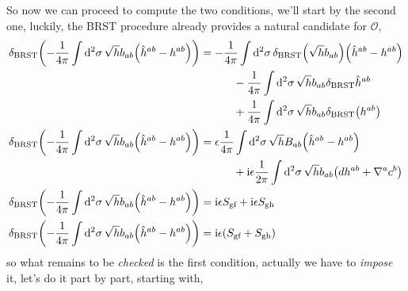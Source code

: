 So now we can proceed to compute the two conditions, we'll start by the second one, luckily, the BRST procedure already provides a natural candidate for $\mathcal O$,
\begin{align*}
    \delta_{\textnormal{BRST}}\qty(-\frac{1}{4\pi}\int\dd[2]{\sigma}\sqrt{h}b_{ab}\qty(\hat h^{ab}-h^{ab}))&=-\frac{1}{4\pi}\int\dd[2]{\sigma}\delta_{\textnormal{BRST}}\qty(\sqrt{h}b_{ab})\qty(\hat h^{ab}-h^{ab})\\
    &\quad\quad\quad-\frac{1}{4\pi}\int\dd[2]{\sigma}\sqrt{h}b_{ab}\delta_{\textnormal{BRST}}\hat h^{ab}\\
    &\quad\quad\quad+\frac{1}{4\pi}\int\dd[2]{\sigma}\sqrt{h}b_{ab}\delta_{\textnormal{BRST}}\qty(h^{ab})\\
    \delta_{\textnormal{BRST}}\qty(-\frac{1}{4\pi}\int\dd[2]{\sigma}\sqrt{h}b_{ab}\qty(\hat h^{ab}-h^{ab}))&=\epsilon\frac{1}{4\pi}\int\dd[2]{\sigma}\sqrt{h}B_{ab}\qty(\hat h^{ab}-h^{ab})\\
    &\quad\quad\quad+\textnormal{i}\epsilon\frac{1}{2\pi}\int\dd[2]{\sigma}\sqrt{h}b_{ab}\qty(dh^{ab}+\nabla^{a}c^{b})\\
    \delta_{\textnormal{BRST}}\qty(-\frac{1}{4\pi}\int\dd[2]{\sigma}\sqrt{h}b_{ab}\qty(\hat h^{ab}-h^{ab}))&=\textnormal{i}\epsilon S_{\textnormal{gf}}+\textnormal{i}\epsilon S_{\textnormal{gh}}\\
    \delta_{\textnormal{BRST}}\qty(-\frac{1}{4\pi}\int\dd[2]{\sigma}\sqrt{h}b_{ab}\qty(\hat h^{ab}-h^{ab}))&=\textnormal{i}\epsilon \qty(S_{\textnormal{gf}}+S_{\textnormal{gh}})
\end{align*}
so what remains to be \textit{checked} is the first condition, actually we have to \textit{impose} it, let's do it part by part, starting with, 
